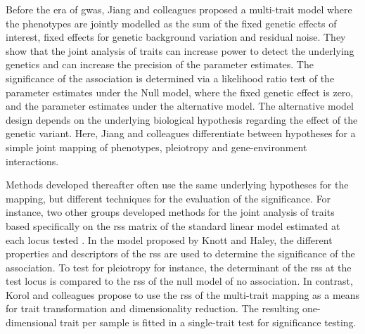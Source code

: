 Before the era of \gls{gwas}, Jiang and colleagues \parencite*{Jiang1995} proposed a multi-trait model where the phenotypes are jointly modelled as the sum of the fixed genetic effects of interest, fixed effects for genetic background variation and residual noise. They show that the joint analysis of traits can increase power to detect the underlying genetics and can increase the precision of the parameter estimates. The significance of the association is determined via a likelihood ratio test of the parameter estimates under the Null model, where the fixed genetic effect is zero, and the parameter estimates under the alternative model. The alternative model design depends on the underlying biological hypothesis regarding the effect of the genetic variant. Here, Jiang and colleagues differentiate between hypotheses for a simple joint mapping of phenotypes, pleiotropy and gene-environment interactions.%

Methods developed thereafter often use the same underlying hypotheses for the mapping, but different techniques for the evaluation of the significance. For instance, two other groups developed methods for the joint analysis of traits based specifically on the \gls{rss} matrix of the standard linear model estimated at each locus tested \citep{Knott2000,Korol2001}. In the model proposed by Knott and Haley, the different properties and descriptors of the \gls{rss} are used to determine the significance of the association. To test for pleiotropy for instance, the determinant of the \gls{rss} at the test locus is compared to the \gls{rss} of the null model of no association. In contrast, Korol and colleagues propose to use the \gls{rss} of the multi-trait mapping as a means for trait transformation and dimensionality reduction. The resulting one-dimensional trait per sample is fitted in a single-trait test for significance testing.  

